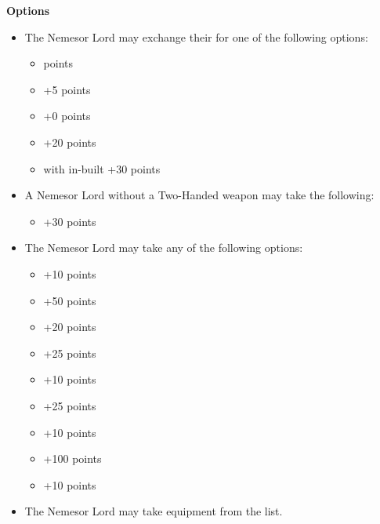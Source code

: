 \begin{minipage}[t]{0.72\textwidth}
	\vspace*{2em}
	\textbf{Options}
	\begin{itemize}
		\item The Nemesor Lord may exchange their  for one of the following options:
		\begin{itemize}			
			\item {}  points
			\item {} \dotfill +5 points
			\item {} \dotfill +0 points
			\item {} \dotfill +20 points
			\item {} with in-built  \dotfill +30 points
		\end{itemize}
		\item A Nemesor Lord without a Two-Handed weapon may take the following:
		\begin{itemize}
			\item {} \dotfill +30 points
		\end{itemize}
		\item The Nemesor Lord may take any of the following options:
		\begin{itemize}
			\item {} \dotfill +10 points
			\item {} \dotfill +50 points
			\item {} \dotfill +20 points
			\item {} \dotfill +25 points
			\item {} \dotfill +10 points
			\item {} \dotfill +25 points
			\item {} \dotfill +10 points
			\item {} \dotfill +100 points
			\item {} \dotfill +10 points
		\end{itemize}
		\item The Nemesor Lord may take equipment from the  list.
	\end{itemize}
\end{minipage}
\hspace{0.5em}



